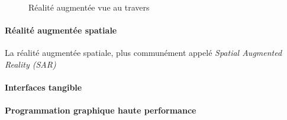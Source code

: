 \begin{figure}[]
    \centering
\caption{Réalité augmentée vue au travers}
\label{fig:STAR}
\end{figure}


\paragraph{Réalité augmentée spatiale}
La réalité augmentée spatiale, plus communément appelé \emph{Spatial Augmented Reality (SAR)} 
\paragraph{Interfaces tangible}

\paragraph{Programmation graphique haute performance}

